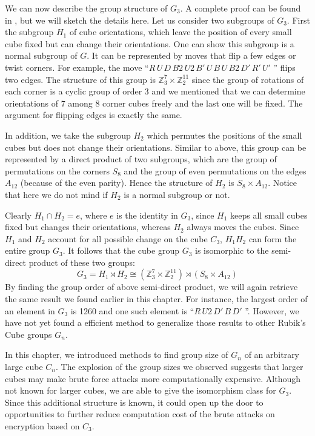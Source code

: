 \par We can now describe the group structure of $G_3$. A complete proof can be found in \cite{janet}, but we will sketch the details here. Let us consider two subgroups of $G_3$. First the subgroup $H_1$ of cube orientations, which leave the position of every small cube fixed but can change their orientations. One can show this subgroup is a normal subgroup of $G$. It can be represented by moves that flip a few edges or twist corners. For example, the move ``$R\,U\,D\,B2\,U2\,B'\,U\,B\,U\,B2\,D'\,R'\,U'$ '' flips two edges. The structure of this group is $\mathbb{Z}_3^7 \times \mathbb{Z}_2^{11}$ since the group of rotations of each corner is a cyclic group of order $3$ and we mentioned that we can determine orientations of 7 among 8 corner cubes freely and the last one will be fixed. The argument for flipping edges is exactly the same.
\par In addition, we take the subgroup $H_2$ which permutes the positions of the small cubes but does not change their orientations. Similar to above, this group can be represented by a direct product of two subgroups, which are the group of permutations on the corners $S_8$ and the group of even permutations on the edges $A_{12}$ (because of the even parity). Hence the structure of $H_2$ is $S_8 \times A_{12}$. Notice that here we do not mind if $H_2$ is a normal subgroup or not.
\par Clearly $H_1 \cap H_2 = e$, where $e$ is the identity in $G_3$, since $H_1$ keeps all small cubes fixed but changes their orientations, whereas $H_2$ always moves the cubes. Since $H_1$ and $H_2$ account for all possible change on the cube $C_3$, $H_1H_2$ can form the entire group $G_3$. It follows that the cube group $G_3$ is isomorphic to the semi-direct product of these two groups:
$$G_3 = H_1 \rtimes H_2 \cong (\mathbb{Z}_3^7 \times \mathbb{Z}_2^{11}) \rtimes (S_8 \times A_{12})$$
By finding the group order of above semi-direct product, we will again retrieve the same result we found earlier in this chapter. For instance, the largest order of an element in $G_3$ is 1260 and one such element is ``$R\,U2\,D'\,B\,D'$ ''\cite{order}. However, we have not yet found a efficient method to generalize those results to other Rubik's Cube groups $G_n$.
\par In this chapter, we introduced methods to find group size of $G_n$ of an arbitrary large cube $C_n$. The explosion of the group sizes we observed suggests that larger cubes may make brute force attacks more computationally expensive. Although not known for larger cubes, we are able to give the isomorphism class for $G_3$. Since this additional structure is known, it could open up the door to opportunities to further reduce computation cost of the brute attacks on encryption based on $C_3$.